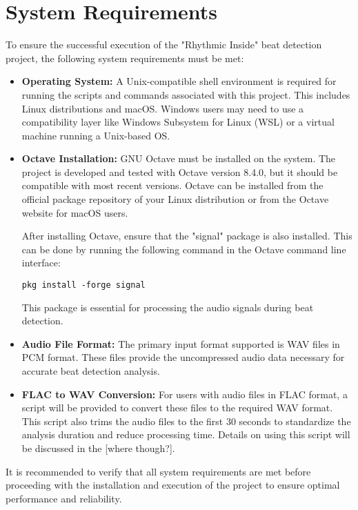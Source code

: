 \section{System Requirements}

To ensure the successful execution of the "Rhythmic Inside" beat detection project, the following system requirements must be met:

\begin{itemize}
    \item \textbf{Operating System:} A Unix-compatible shell environment is required for running the scripts and commands associated with this project. This includes Linux distributions and macOS. Windows users may need to use a compatibility layer like Windows Subsystem for Linux (WSL) or a virtual machine running a Unix-based OS.
    
    \item \textbf{Octave Installation:} GNU Octave must be installed on the system. The project is developed and tested with Octave version 8.4.0, but it should be compatible with most recent versions. Octave can be installed from the official package repository of your Linux distribution or from the Octave website for macOS users.
    
After installing Octave, ensure that the "signal" package is also installed. This can be done by running the following command in the Octave command line interface:

\lstset{style=MATLABStyle}
\begin{lstlisting}[caption={Installing signal in MATLAB/Octave}, label=lst]
pkg install -forge signal
\end{lstlisting}

This package is essential for processing the audio signals during beat detection.
    
    \item \textbf{Audio File Format:} The primary input format supported is WAV files in PCM format. These files provide the uncompressed audio data necessary for accurate beat detection analysis.
    
    \item \textbf{FLAC to WAV Conversion:} For users with audio files in FLAC format, a script will be provided to convert these files to the required WAV format. This script also trims the audio files to the first 30 seconds to standardize the analysis duration and reduce processing time. Details on using this script will be discussed in the [where though?].
\end{itemize}

It is recommended to verify that all system requirements are met before proceeding with the installation and execution of the project to ensure optimal performance and reliability.
